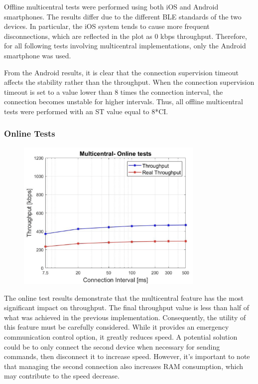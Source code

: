 \documentclass{Configuration_Files/PoliMi3i_thesis}
\begin{document}
Offline multicentral tests were performed using both iOS and Android smartphones. The results differ due to the different BLE standards of the two devices. In particular, the iOS system tends to cause more frequent disconnections, which are reflected in the plot as 0 kbps throughput. Therefore, for all following tests involving multicentral implementations, only the Android smartphone was used.

From the Android results, it is clear that the connection supervision timeout affects the stability rather than the throughput. When the connection supervision timeout is set to a value lower than 8 times the connection interval, the connection becomes unstable for higher intervals. Thus, all offline multicentral tests were performed with an ST value equal to 8*CI.

\subsubsection*{Online Tests}

\begin{figure}[H]
    \centering
    \includegraphics[width=0.8\textwidth]{Results Manuel/figure27}
    \label{fig:figure1}
\end{figure}

The online test results demonstrate that the multicentral feature has the most significant impact on throughput. The final throughput value is less than half of what was achieved in the previous implementation. Consequently, the utility of this feature must be carefully considered. While it provides an emergency communication control option, it greatly reduces speed. A potential solution could be to only connect the second device when necessary for sending commands, then disconnect it to increase speed. However, it's important to note that managing the second connection also increases RAM consumption, which may contribute to the speed decrease.
\end{document}
